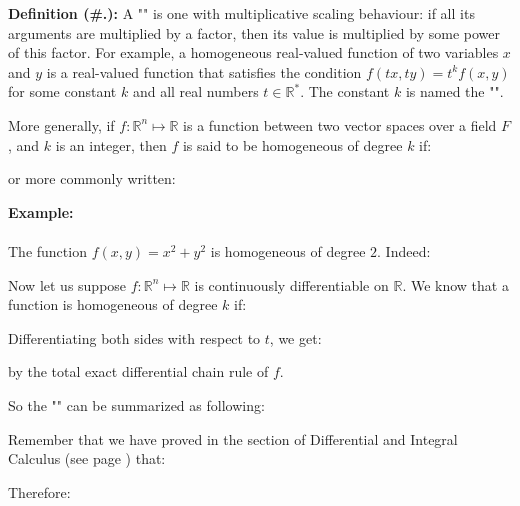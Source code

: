	\textbf{Definition (\#\thesection.\mydef):} A "\label{homogeneous function}" is one with multiplicative scaling behaviour: if all its arguments are multiplied by a factor, then its value is multiplied by some power of this factor. For example, a homogeneous real-valued function of two variables $x$ and $y$ is a real-valued function that satisfies the condition $f(t x,t y)=t ^{k}f(x,y)$ for some constant $k$ and all real numbers $t\in \mathbb{R}^*$. The constant $k$ is named the "".
	
	More generally, if $f:\mathbb{R}^n\mapsto \mathbb{R}$ is a function between two vector spaces over a field $F$, and $k$ is an integer, then $f$ is said to be homogeneous of degree $k$ if:
	
	or more commonly written:
	
	
	\begin{tcolorbox}[colframe=black,colback=white,sharp corners]
	\textbf{{\Large {}}Example:}\\\\
	The function $f(x,y)=x^{2}+y^{2}$ is homogeneous of degree $2$. Indeed:
	
	\end{tcolorbox}
	
	Now let us suppose $f:\mathbb{R}^n\mapsto \mathbb{R}$ is continuously differentiable on $\mathbb{R}$. We know that a function is homogeneous of degree $k$ if:
	
	Differentiating both sides with respect to $t$, we get:
	
	by the total exact differential chain rule of $f$. 
	
	So the "\label{Euler theorem for homogeneous functions}" can be summarized as following:
	
	\begin{tcolorbox}[title=Remark,arc=10pt,breakable,drop lifted shadow,
  skin=enhanced,
  skin first is subskin of={enhancedfirst}{arc=10pt,no shadow},
  skin middle is subskin of={enhancedmiddle}{arc=10pt,no shadow},
  skin last is subskin of={enhancedlast}{drop lifted shadow}]
	Remember that we have proved in the section of Differential and Integral Calculus (see page \pageref{total exact differential}) that:
	
	Therefore:
	
	\end{tcolorbox}
	
